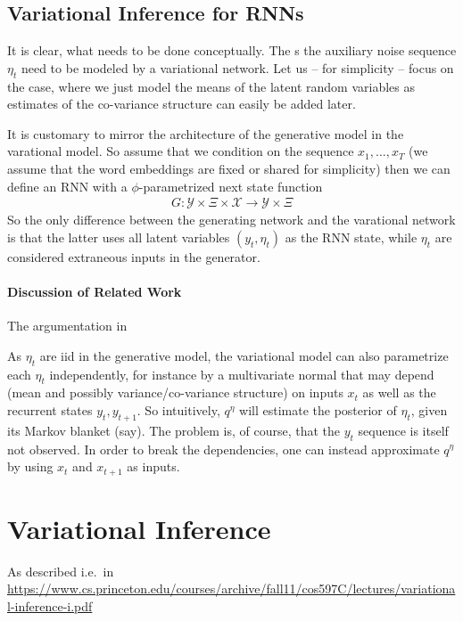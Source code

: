 \documentclass[a4paper,10pt]{article}
\begin{document}
\subsection{Variational Inference for RNNs} 

It is clear, what needs to be done conceptually. The s the auxiliary noise sequence $\eta_t$ need to be modeled by a variational network. Let us -- for simplicity -- focus on the case, where we just model the means of the latent random variables as estimates of the co-variance structure can easily be added later. 

It is customary to mirror the architecture of the generative model in the varational model. So assume that we condition on the sequence $x_1,\dots,x_T$ (we assume that the word embeddings are fixed or shared for simplicity) then we can define an RNN with a $\phi$-parametrized next state function 
\begin{align}
G: \mathcal Y \times  \Xi \times  \mathcal X \to \mathcal Y \times \Xi
\end{align}
So the only difference between the generating network and the varational network is that the latter uses all latent variables $(y_t,\eta_t)$ as the RNN state, while $\eta_t$ are considered extraneous inputs in the generator. 

\paragraph{Discussion of Related Work}  
The argumentation in \cite{bowman2015generating}




\newpage
 




As $\eta_t$ are iid in the generative model, the variational model can also parametrize each $\eta_t$ independently, for instance by a multivariate normal that may depend (mean and possibly variance/co-variance structure) on inputs $x_t$ as well as the recurrent states $y_t, y_{t+1}$. So intuitively, $q^\eta$ will estimate the posterior of $\eta_t$, given its Markov blanket (say). The problem is, of course, that the $y_t$ sequence is itself not observed. In order to break the dependencies, one can instead approximate $q^\eta$ by  using $x_t$ and $x_{t+1}$ as inputs.


\newpage

\section{Variational Inference}
As described i.e.\ in \url{https://www.cs.princeton.edu/courses/archive/fall11/cos597C/lectures/variational-inference-i.pdf}
\end{document}
